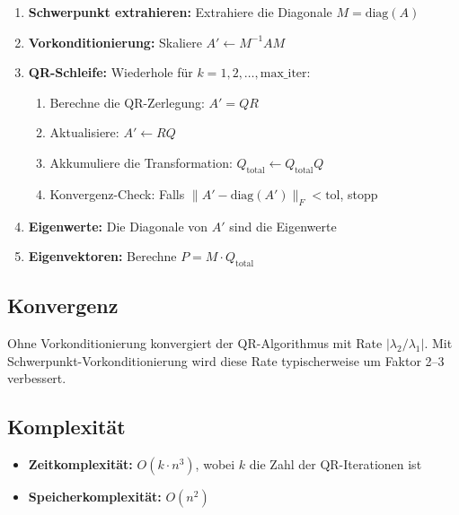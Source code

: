 \documentclass[a4paper,12pt]{article}
\begin{document}
\begin{enumerate}
\item \textbf{Schwerpunkt extrahieren:} Extrahiere die Diagonale $M = \text{diag}(A)$

\item \textbf{Vorkonditionierung:} Skaliere $A' \leftarrow M^{-1} A M$

\item \textbf{QR-Schleife:} Wiederhole für $k = 1, 2, \ldots, \text{max\_iter}$:

\begin{enumerate}
\item Berechne die QR-Zerlegung: $A' = Q R$

\item Aktualisiere: $A' \leftarrow R Q$

\item Akkumuliere die Transformation: $Q_{\text{total}} \leftarrow Q_{\text{total}} Q$

\item Konvergenz-Check: Falls $\|A' - \text{diag}(A')\|_F < \text{tol}$, stopp
\end{enumerate}

\item \textbf{Eigenwerte:} Die Diagonale von $A'$ sind die Eigenwerte

\item \textbf{Eigenvektoren:} Berechne $P = M \cdot Q_{\text{total}}$
\end{enumerate}

\subsection{Konvergenz}

Ohne Vorkonditionierung konvergiert der QR-Algorithmus mit Rate $|\lambda_2 / \lambda_1|$. Mit Schwerpunkt-Vorkonditionierung wird diese Rate typischerweise um Faktor 2--3 verbessert.
\subsection{Komplexität}

\begin{itemize}
\item \textbf{Zeitkomplexität:} $O(k \cdot n^3)$, wobei $k$ die Zahl der QR-Iterationen ist
\item \textbf{Speicherkomplexität:} $O(n^2)$
\end{itemize}

\end{document}
